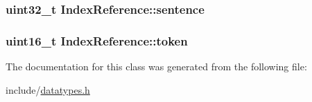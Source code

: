 \subsubsection[{sentence}]{\setlength{\rightskip}{0pt plus 5cm}uint32\+\_\+t Index\+Reference\+::sentence}\label{classIndexReference_ac8e7129f517e6ceb4c223e7568219f47}
\hypertarget{classIndexReference_a90f3de27395e19a1d53f62f9e7bea1d7}{}
\subsubsection[{token}]{\setlength{\rightskip}{0pt plus 5cm}uint16\+\_\+t Index\+Reference\+::token}\label{classIndexReference_a90f3de27395e19a1d53f62f9e7bea1d7}


The documentation for this class was generated from the following file\+:\begin{DoxyCompactItemize}
\item 
include/\hyperlink{datatypes_8h}{datatypes.\+h}\end{DoxyCompactItemize}
